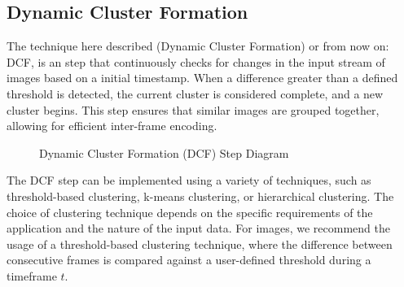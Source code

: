 \documentclass[twocolumn]{article}
\begin{document}
\subsection{Dynamic Cluster Formation}
The technique here described (Dynamic Cluster Formation) or from now on: DCF, is an step that continuously checks for changes in the input stream of images based on a initial timestamp. When a difference greater than a defined threshold is detected, the current cluster is considered complete, and a new cluster begins. This step ensures that similar images are grouped together, allowing for efficient inter-frame encoding.

\begin{figure}[!h]
    \centering
    \caption{Dynamic Cluster Formation (DCF) Step Diagram}
    \label{fig:figure1}
\end{figure}

The DCF step can be implemented using a variety of techniques, such as threshold-based clustering, k-means clustering, or hierarchical clustering. The choice of clustering technique depends on the specific requirements of the application and the nature of the input data. For images, we recommend the usage of a threshold-based clustering technique, where the difference between consecutive frames is compared against a user-defined threshold during a timeframe $t$.
\end{document}

